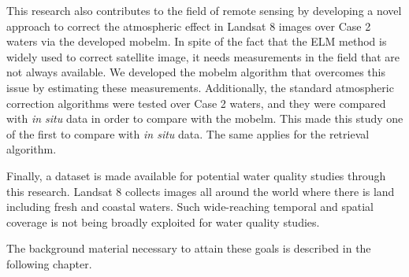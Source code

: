 This research also contributes to the field of remote sensing by developing a novel approach to correct the atmospheric effect in Landsat 8 images over Case 2 waters via the developed \gls{mobelm}. In spite of the fact that the ELM method is widely used to correct satellite image, it needs measurements in the field that are not always available. We developed the \gls{mobelm} algorithm that overcomes this issue by estimating these measurements. Additionally, the standard atmospheric correction algorithms were tested over Case 2 waters, and they were compared with {\it in situ} data in order to compare with the \gls{mobelm}. This made this study one of the first to compare with {\it in situ} data. The same applies for the retrieval algorithm.

Finally, a dataset is made available for potential water quality studies through this research. Landsat 8 collects images all around the world where there is land including fresh and coastal waters. Such wide-reaching temporal and spatial coverage is not being broadly exploited for water quality studies.

The background material necessary to attain these goals is described in the following chapter.
